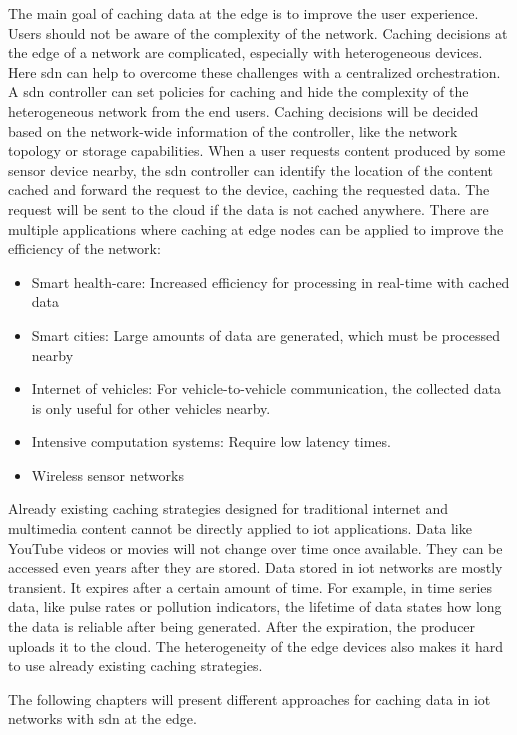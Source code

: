 \documentclass[conference]{IEEEtran}
\begin{document}
	The main goal of caching data at the edge is to improve the user experience. Users should not be aware of the complexity of the network. Caching decisions at the edge of a network are complicated, especially with heterogeneous devices. Here \ac{sdn} can help to overcome these challenges with a centralized orchestration. A \ac{sdn} controller can set policies for caching and hide the complexity of the heterogeneous network from the end users. Caching decisions will be decided based on the network-wide information of the controller, like the network topology or storage capabilities. When a user requests content produced by some sensor device nearby, the \ac{sdn} controller can identify the location of the content cached and forward the request to the device, caching the requested data. The request will be sent to the cloud if the data is not cached anywhere. \cite{caching-1} There are multiple applications where caching at edge nodes can be applied to improve the efficiency of the network:
	\begin{itemize}
		\item Smart health-care: Increased efficiency for processing in real-time with cached data
		\item Smart cities: Large amounts of data are generated, which must be processed nearby
		\item Internet of vehicles: For vehicle-to-vehicle communication, the collected data is only useful for other vehicles nearby.
		\item Intensive computation systems: Require low latency times.
		\item Wireless sensor networks \cite{caching-1}
	\end{itemize}

	Already existing caching strategies designed for traditional internet and multimedia content cannot be directly applied to \ac{iot} applications. Data like YouTube videos or movies will not change over time once available. They can be accessed even years after they are stored. Data stored in \ac{iot} networks are mostly transient. It expires after a certain amount of time. For example, in time series data, like pulse rates or pollution indicators, the lifetime of data states how long the data is reliable after being generated. After the expiration, the producer uploads it to the cloud. The heterogeneity of the edge devices also makes it hard to use already existing caching strategies. \cite{caching-2}

	The following chapters will present different approaches for caching data in \ac{iot} networks with \ac{sdn} at the edge.
\end{document}
